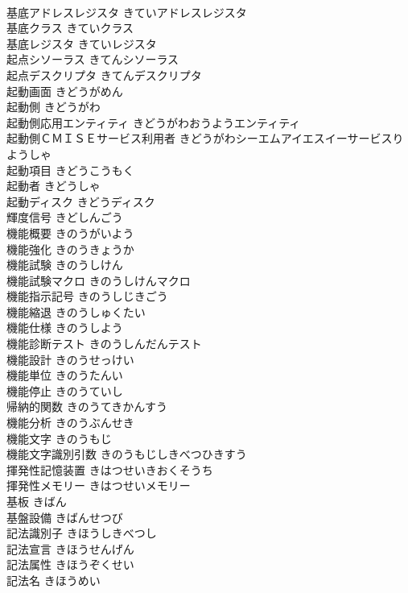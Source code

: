 \documentclass[8pt]{extreport}
\begin{document}
\begin{CJK}{UTF8}{min}
\\	基底アドレスレジスタ	きていアドレスレジスタ	
\\	基底クラス	きていクラス	
\\	基底レジスタ	きていレジスタ	
\\	起点シソーラス	きてんシソーラス	
\\	起点デスクリプタ	きてんデスクリプタ	
\\	起動画面	きどうがめん	
\\	起動側	きどうがわ	
\\	起動側応用エンティティ	きどうがわおうようエンティティ	
\\	起動側ＣＭＩＳＥサービス利用者	きどうがわシーエムアイエスイーサービスりようしゃ	
\\	起動項目	きどうこうもく	
\\	起動者	きどうしゃ	
\\	起動ディスク	きどうディスク	
\\	輝度信号	きどしんごう	
\\	機能概要	きのうがいよう	
\\	機能強化	きのうきょうか	
\\	機能試験	きのうしけん	
\\	機能試験マクロ	きのうしけんマクロ	
\\	機能指示記号	きのうしじきごう	
\\	機能縮退	きのうしゅくたい	
\\	機能仕様	きのうしよう	
\\	機能診断テスト	きのうしんだんテスト	
\\	機能設計	きのうせっけい	
\\	機能単位	きのうたんい	
\\	機能停止	きのうていし	
\\	帰納的関数	きのうてきかんすう	
\\	機能分析	きのうぶんせき	
\\	機能文字	きのうもじ	
\\	機能文字識別引数	きのうもじしきべつひきすう	
\\	揮発性記憶装置	きはつせいきおくそうち	
\\	揮発性メモリー	きはつせいメモリー	
\\	基板	きばん	
\\	基盤設備	きばんせつび	
\\	記法識別子	きほうしきべつし	
\\	記法宣言	きほうせんげん	
\\	記法属性	きほうぞくせい	
\\	記法名	きほうめい	

\end{CJK}
\end{document}
